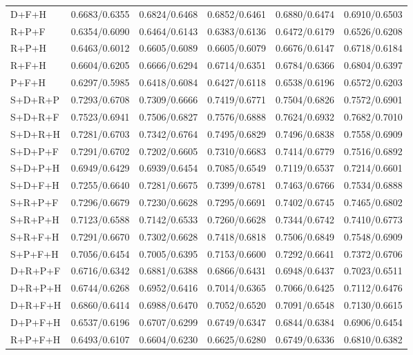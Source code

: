\begin{longtable}{lrrrrr}
D+F+H & 0.6683/0.6355 & 0.6824/0.6468 & 0.6852/0.6461 & 0.6880/0.6474 & 0.6910/0.6503 \\
R+P+F & 0.6354/0.6090 & 0.6464/0.6143 & 0.6383/0.6136 & 0.6472/0.6179 & 0.6526/0.6208 \\
R+P+H & 0.6463/0.6012 & 0.6605/0.6089 & 0.6605/0.6079 & 0.6676/0.6147 & 0.6718/0.6184 \\
R+F+H & 0.6604/0.6205 & 0.6666/0.6294 & 0.6714/0.6351 & 0.6784/0.6366 & 0.6804/0.6397 \\
P+F+H & 0.6297/0.5985 & 0.6418/0.6084 & 0.6427/0.6118 & 0.6538/0.6196 & 0.6572/0.6203 \\
S+D+R+P & 0.7293/0.6708 & 0.7309/0.6666 & 0.7419/0.6771 & 0.7504/0.6826 & 0.7572/0.6901 \\
S+D+R+F & 0.7523/0.6941 & 0.7506/0.6827 & 0.7576/0.6888 & 0.7624/0.6932 & 0.7682/0.7010 \\
S+D+R+H & 0.7281/0.6703 & 0.7342/0.6764 & 0.7495/0.6829 & 0.7496/0.6838 & 0.7558/0.6909 \\
S+D+P+F & 0.7291/0.6702 & 0.7202/0.6605 & 0.7310/0.6683 & 0.7414/0.6779 & 0.7516/0.6892 \\
S+D+P+H & 0.6949/0.6429 & 0.6939/0.6454 & 0.7085/0.6549 & 0.7119/0.6537 & 0.7214/0.6601 \\
S+D+F+H & 0.7255/0.6640 & 0.7281/0.6675 & 0.7399/0.6781 & 0.7463/0.6766 & 0.7534/0.6888 \\
S+R+P+F & 0.7296/0.6679 & 0.7230/0.6628 & 0.7295/0.6691 & 0.7402/0.6745 & 0.7465/0.6802 \\
S+R+P+H & 0.7123/0.6588 & 0.7142/0.6533 & 0.7260/0.6628 & 0.7344/0.6742 & 0.7410/0.6773 \\
S+R+F+H & 0.7291/0.6670 & 0.7302/0.6628 & 0.7418/0.6818 & 0.7506/0.6849 & 0.7548/0.6909 \\
S+P+F+H & 0.7056/0.6454 & 0.7005/0.6395 & 0.7153/0.6600 & 0.7292/0.6641 & 0.7372/0.6706 \\
D+R+P+F & 0.6716/0.6342 & 0.6881/0.6388 & 0.6866/0.6431 & 0.6948/0.6437 & 0.7023/0.6511 \\
D+R+P+H & 0.6744/0.6268 & 0.6952/0.6416 & 0.7014/0.6365 & 0.7066/0.6425 & 0.7112/0.6476 \\
D+R+F+H & 0.6860/0.6414 & 0.6988/0.6470 & 0.7052/0.6520 & 0.7091/0.6548 & 0.7130/0.6615 \\
D+P+F+H & 0.6537/0.6196 & 0.6707/0.6299 & 0.6749/0.6347 & 0.6844/0.6384 & 0.6906/0.6454 \\
R+P+F+H & 0.6493/0.6107 & 0.6604/0.6230 & 0.6625/0.6280 & 0.6749/0.6336 & 0.6810/0.6382 \\

\end{longtable}
